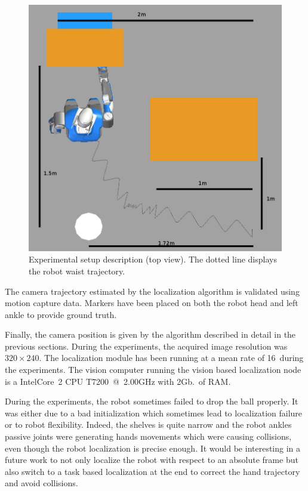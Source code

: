 \begin{figure}[ht!]
  \begin{center}
    \includegraphics[width=\linewidth]{images/dimensions.png}
  \end{center}
  \caption{Experimental setup description (top view). The dotted line
    displays the robot waist trajectory.\label{fig:xp_setup_dim}}
\end{figure}


The camera trajectory estimated by the localization algorithm is
validated using motion capture data. Markers have been placed on both
the robot head and left ankle to provide ground truth.


Finally, the camera position is given by the algorithm described in
detail in the previous sections. During the experiments, the acquired
image resolution was $320 \times 240$. The localization module has
been running at a mean rate of 16\hertz~during the experiments. The
vision computer running the vision based localization node is a
Intel\textregistered Core\texttrademark\ 2 CPU T7200~@~2.00GHz with
2Gb.\ of RAM.

During the experiments, the robot sometimes failed to drop the ball
properly. It was either due to a bad initialization which sometimes
lead to localization failure or to robot flexibility. Indeed, the
shelves is quite narrow and the robot ankles passive joints were
generating hands movements which were causing collisions, even though
the robot localization is precise enough. It would be interesting in a
future work to not only localize the robot with respect to an absolute
frame but also switch to a task based localization at the end to
correct the hand trajectory and avoid collisions.


